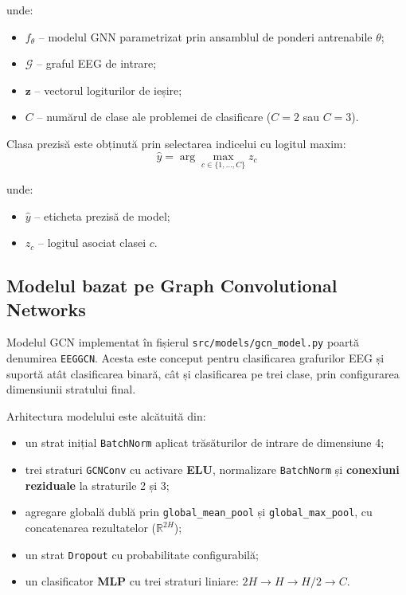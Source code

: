 \documentclass[12pt,a4paper]{report}
\theoremstyle{definition}
\theoremstyle{remark}
\begin{document}
\noindent unde:
\begin{itemize}
    \item $f_{\theta}$ -- modelul GNN parametrizat prin ansamblul de ponderi antrenabile $\theta$;
    \item $\mathcal{G}$ -- graful EEG de intrare;
    \item $\mathbf{z}$ -- vectorul logiturilor de ieșire;
    \item $C$ -- numărul de clase ale problemei de clasificare ($C = 2$ sau $C = 3$).
\end{itemize}

Clasa prezisă este obținută prin selectarea indicelui cu logitul maxim:
\begin{equation}
    \hat{y} = \arg\max_{c \in \{1,\ldots,C\}} z_c
    \label{eq:prediction_rule}
\end{equation}

\noindent unde:
\begin{itemize}
    \item $\hat{y}$ -- eticheta prezisă de model;
    \item $z_c$ -- logitul asociat clasei $c$.
\end{itemize}

\subsection{Modelul bazat pe Graph Convolutional Networks}

Modelul GCN implementat în fișierul \texttt{src/models/gcn\_model.py} poartă denumirea \texttt{EEGGCN}. Acesta este conceput pentru clasificarea grafurilor EEG și suportă atât clasificarea binară, cât și clasificarea pe trei clase, prin configurarea dimensiunii stratului final.

Arhitectura modelului este alcătuită din:
\begin{itemize}
    \item un strat inițial \texttt{BatchNorm} aplicat trăsăturilor de intrare de dimensiune 4;
    \item trei straturi \texttt{GCNConv} cu activare \textbf{ELU}, normalizare \texttt{BatchNorm}
          și \textbf{conexiuni reziduale} la straturile 2 și 3;
    \item agregare globală dublă prin \texttt{global\_mean\_pool} și \texttt{global\_max\_pool},
          cu concatenarea rezultatelor ($\mathbb{R}^{2H}$);
    \item un strat \texttt{Dropout} cu probabilitate configurabilă;
    \item un clasificator \textbf{MLP} cu trei straturi liniare: $2H \to H \to H/2 \to C$.
\end{itemize}
\end{document}
